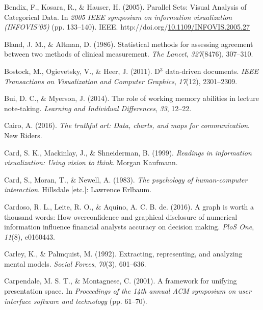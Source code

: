 \documentclass[print]{nuthesis}
\newlength{\cslhangindent}
\newenvironment{CSLReferences}[2]%
{\setlength{\parindent}{0pt}%
\everypar{\setlength{\hangindent}{\cslhangindent}}\ignorespaces}%
{\par}
\begin{document}
\begin{CSLReferences}{1}{0}
\leavevmode{}%
Bendix, F., Kosara, R., \& Hauser, H. (2005). {Parallel Sets: Visual Analysis of Categorical Data}. In \emph{2005 IEEE symposium on information visualization (INFOVIS'05)} (pp. 133--140). IEEE. http://doi.org/\href{https://doi.org/10.1109/INFOVIS.2005.27}{10.1109/INFOVIS.2005.27}

\leavevmode{}%
Bland, J. M., \& Altman, D. (1986). Statistical methods for assessing agreement between two methods of clinical measurement. \emph{The Lancet}, \emph{327}(8476), 307--310.

\leavevmode{}%
Bostock, M., Ogievetsky, V., \& Heer, J. (2011). D\(^3\) data-driven documents. \emph{IEEE Transactions on Visualization and Computer Graphics}, \emph{17}(12), 2301--2309.

\leavevmode{}%
Bui, D. C., \& Myerson, J. (2014). The role of working memory abilities in lecture note-taking. \emph{Learning and Individual Differences}, \emph{33}, 12--22.

\leavevmode{}%
Cairo, A. (2016). \emph{The truthful art: Data, charts, and maps for communication}. New Riders.

\leavevmode{}%
Card, S. K., Mackinlay, J., \& Shneiderman, B. (1999). \emph{Readings in information visualization: Using vision to think}. Morgan Kaufmann.

\leavevmode{}%
Card, S., Moran, T., \& Newell, A. (1983). \emph{The psychology of human-computer interaction}. Hillsdale {[}etc.{]}: Lawrence Erlbaum.

\leavevmode{}%
Cardoso, R. L., Leite, R. O., \& Aquino, A. C. B. de. (2016). A graph is worth a thousand words: How overconfidence and graphical disclosure of numerical information influence financial analysts accuracy on decision making. \emph{PloS One}, \emph{11}(8), e0160443.

\leavevmode{}%
Carley, K., \& Palmquist, M. (1992). Extracting, representing, and analyzing mental models. \emph{Social Forces}, \emph{70}(3), 601--636.

\leavevmode{}%
Carpendale, M. S. T., \& Montagnese, C. (2001). A framework for unifying presentation space. In \emph{Proceedings of the 14th annual ACM symposium on user interface software and technology} (pp. 61--70).


\end{CSLReferences}
\end{document}
